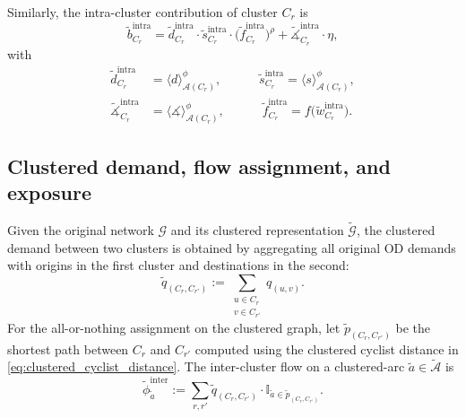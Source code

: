 \documentclass[lettersize,journal]{IEEEtran}
\begin{document}
Similarly, the intra-cluster contribution of cluster $C_r$ is
\begin{equation}
  \tilde{b}^{\mathrm{intra}}_{C_r}
  =
  \tilde{d}^{\mathrm{intra}}_{C_r} \cdot
  \tilde{s}^{\mathrm{intra}}_{C_r} \cdot
  \bigl(\tilde{f}^{\mathrm{intra}}_{C_r}\bigr)^\rho
  +
  \tilde{\measuredangle}^{\mathrm{intra}}_{C_r} \cdot \eta,
\end{equation}
with
\begin{equation}
\begin{aligned}
\label{eq:clustered_parameters}
  \tilde{d}^{\mathrm{intra}}_{C_r}
  &= \langle d\rangle_{\mathcal{A}(C_r)}^{\phi}, \qquad \quad
  \tilde{s}^{\mathrm{intra}}_{C_r}
  = \langle s\rangle_{\mathcal{A}(C_r)}^{\phi}, \\
  \tilde{\measuredangle}^{\mathrm{intra}}_{C_r}
  &= \langle \measuredangle\rangle_{\mathcal{A}(C_r)}^{\phi}, \qquad \quad
  \tilde{f}^{\mathrm{intra}}_{C_r}
  = f\bigl(\tilde{w}^{\mathrm{intra}}_{C_r}\bigr).
\end{aligned}
\end{equation}


\subsection{Clustered demand, flow assignment, and exposure}

Given the original network $\mathcal{G}$ and its clustered representation
$\tilde{\mathcal{G}}$, the clustered demand between two clusters is obtained by
aggregating all original OD demands with origins in the first cluster and
destinations in the second:
\begin{equation}
\label{cluster_demand}
  \tilde{q}_{(C_r,C_{r'})}
  :=
  \sum_{\substack{u\in C_r \\ v\in C_{r'}}}
  q_{(u,v)}.
\end{equation}
For the all-or-nothing assignment on the clustered graph, let
$\tilde{p}_{(C_r,C_{r'})}$ be the shortest path between $C_r$ and $C_{r'}$
computed using the clustered cyclist distance in
\eqref{eq:clustered_cyclist_distance}. The inter-cluster flow on a clustered-arc
$\tilde{a}\in\tilde{\mathcal{A}}$ is
\begin{equation}
\label{eq_cluster_flow_inter}
  \tilde{\phi}^{\mathrm{inter}}_{\tilde{a}}
  :=
  \sum_{r,r'}
  \tilde{q}_{(C_r,C_{r'})} \cdot
  \mathbb{I}_{\tilde{a}\in\tilde{p}_{(C_r,C_{r'})}}.
\end{equation}
\end{document}
